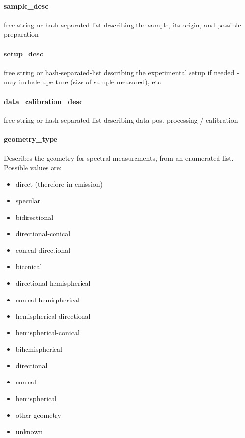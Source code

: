 \documentclass[11pt,a4paper]{ivoa}
\begin{document}
\paragraph{sample\_desc}

free string or hash-separated-list describing the sample, its origin, and possible preparation

\paragraph{setup\_desc}

free string or hash-separated-list describing the experimental setup if needed - may include aperture (size of sample measured), etc

\paragraph{data\_calibration\_desc}

free string or hash-separated-list describing data post-processing / calibration

\paragraph{geometry\_type}

Describes the geometry for spectral measurements, from an enumerated list. Possible values are:

\begin{itemize}
\item direct (therefore in emission)
\item specular
\item bidirectional
\item directional-conical
\item conical-directional
\item biconical
\item directional-hemispherical
\item conical-hemispherical
\item hemispherical-directional
\item hemispherical-conical
\item bihemispherical
\item directional
\item conical
\item hemispherical
\item other geometry
\item unknown
\end{itemize}
\end{document}
